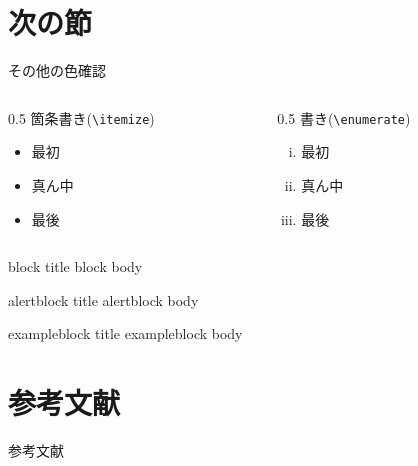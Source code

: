 \documentclass[10pt,dvipdfmx,cjk]{beamer}
\begin{document}
  \section{次の節}
  \begin{frame}{その他の色確認}{}
    \begin{columns}
      \begin{column}[t]{0.5\textwidth}
        箇条書き(\texttt{\textbackslash itemize})
        \begin{itemize}
          \item 最初
          \item 真ん中
          \item 最後
        \end{itemize}
      \end{column}
      \begin{column}[t]{0.5\textwidth}
        書き(\texttt{\textbackslash enumerate})
        \begin{enumerate}[(i)]
          \item 最初
          \item 真ん中
          \item 最後
        \end{enumerate}
      \end{column}
    \end{columns}
  
    \begin{block}{block title}
      block body
    \end{block}
    \begin{alertblock}{alertblock title}
      alertblock body
    \end{alertblock}
    \begin{exampleblock}{exampleblock title}
      exampleblock body
    \end{exampleblock}
  \end{frame}

  \section*{参考文献}
  \begin{frame}{参考文献}{}
    
  \end{frame}
\end{document}
